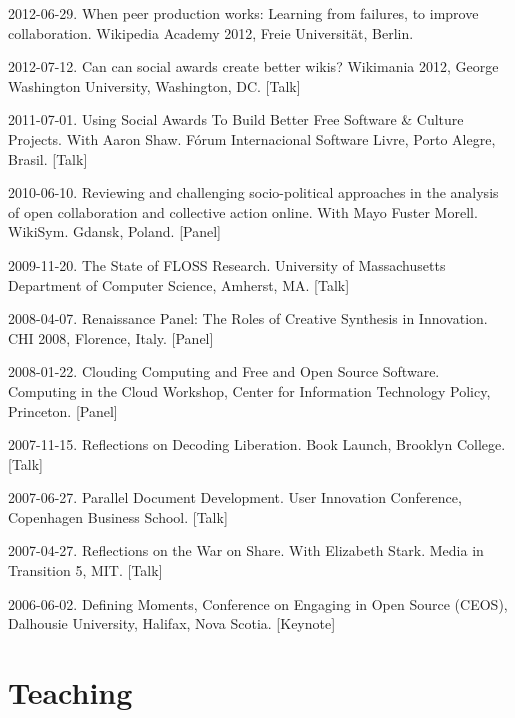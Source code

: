 \documentclass[10pt]{article}
\newenvironment{cvlist}{
\begin{list}{}{\leftmargin=3.0em \itemindent=-3.0em}
  \setlength{\itemsep}{0pt}
  \setlength{\parskip}{0em}
  \setlength{\parsep}{1em}
  \setlength{\parindent}{0em}}
{\vspace{1em}
\end{list}}
\begin{document}
\begin{cvlist}
\item 2012-06-29. When peer production works: Learning from failures, to improve
collaboration. Wikipedia Academy 2012, Freie Universität, Berlin.

\item 2012-07-12. Can can social awards create better wikis? Wikimania
  2012, George Washington University, Washington, DC. [Talk]

\item 2011-07-01. Using Social Awards To Build Better Free Software \&
  Culture Projects.  With Aaron Shaw. Fórum Internacional
  Software Livre, Porto Alegre, Brasil. [Talk]

\item 2010-06-10. Reviewing and challenging socio-political approaches
  in the analysis of open collaboration and collective action
  online. With Mayo Fuster Morell. WikiSym. Gdansk, Poland. [Panel]

\item 2009-11-20. The State of FLOSS Research. University of
  Massachusetts Department of Computer Science, Amherst,
  MA. [Talk]

\item 2008-04-07. Renaissance Panel: The Roles of Creative Synthesis
  in Innovation. CHI 2008, Florence, Italy. [Panel]

\item 2008-01-22. Clouding Computing and Free and Open Source
  Software. Computing in the Cloud Workshop, Center for
  Information Technology Policy, Princeton. [Panel]

\item 2007-11-15. Reflections on Decoding Liberation. Book Launch,
  Brooklyn College. [Talk]

\item 2007-06-27. Parallel Document Development. User Innovation
  Conference, Copenhagen Business School. [Talk]

\item 2007-04-27. Reflections on the War on Share. With Elizabeth
  Stark. Media in Transition 5, MIT. [Talk]

\item 2006-06-02. Defining Moments, Conference on Engaging in Open
  Source (CEOS), Dalhousie University, Halifax, Nova Scotia. [Keynote]

\end{cvlist}

\section{Teaching}
\end{document}
